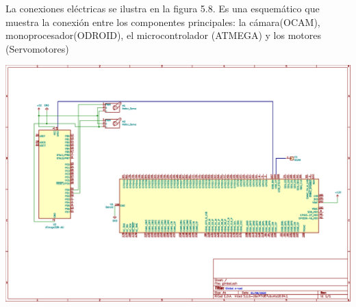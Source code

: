 La conexiones eléctricas se ilustra en la figura 5.8. Es una esquemático que muestra la conexión entre los componentes principales: la cámara(OCAM), monoprocesador(ODROID),
el microcontrolador (ATMEGA) y los motores (Servomotores)
\begin{center}
	\includegraphics[width=1.0\textwidth]{Contenido/Cuerpo/Capitulo5/Fig21.eps}
	\label{Fig1}
\end{center}




